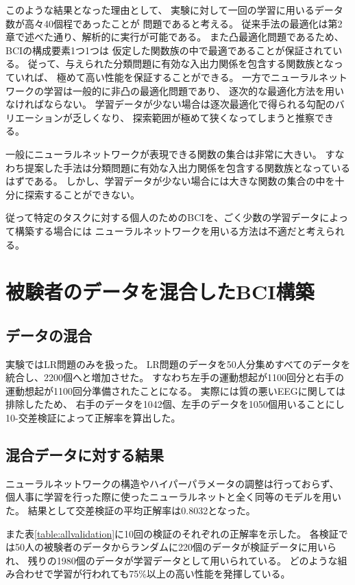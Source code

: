このような結果となった理由として、
実験に対して一回の学習に用いるデータ数が高々40個程であったことが
問題であると考える。
従来手法の最適化は第2章で述べた通り、解析的に実行が可能である。
また凸最適化問題であるため、BCIの構成要素1つ1つは
仮定した関数族の中で最適であることが保証されている。
従って、与えられた分類問題に有効な入出力関係を包含する関数族となっていれば、
極めて高い性能を保証することができる。
一方でニューラルネットワークの学習は一般的に非凸の最適化問題であり、
逐次的な最適化方法を用いなければならない。
学習データが少ない場合は逐次最適化で得られる勾配のバリエーションが乏しくなり、
探索範囲が極めて狭くなってしまうと推察できる。

一般にニューラルネットワークが表現できる関数の集合は非常に大きい。
すなわち提案した手法は分類問題に有効な入出力関係を包含する関数族となっているはずである。
しかし、学習データが少ない場合には大きな関数の集合の中を十分に探索することができない。

従って特定のタスクに対する個人のためのBCIを、ごく少数の学習データによって構築する場合には
ニューラルネットワークを用いる方法は不適だと考えられる。

\section{\mc 被験者のデータを混合したBCI構築}
\subsection{\mc データの混合}
実験ではLR問題のみを扱った。
LR問題のデータを50人分集めすべてのデータを統合し、2200個へと増加させた。
すなわち左手の運動想起が1100回分と右手の運動想起が1100回分準備されたことになる。
実際には質の悪いEEGに関しては排除したため、
右手のデータを1042個、左手のデータを1050個用いることにし10-交差検証によって正解率を算出した。

\subsection{\mc 混合データに対する結果}
ニューラルネットワークの構造やハイパーパラメータの調整は行っておらず、
個人事に学習を行った際に使ったニューラルネットと全く同等のモデルを用いた。
結果として交差検証の平均正解率は0.8032となった。

また表\ref{table:allvalidation}に10回の検証のそれぞれの正解率を示した。
各検証では50人の被験者のデータからランダムに220個のデータが検証データに用いられ、
残りの1980個のデータが学習データとして用いられている。
どのような組み合わせで学習が行われても75\%以上の高い性能を発揮している。
\begin{table}[t]
    \centering
    \caption{10交差検証の内訳}
    \label{table:allvalidation}
\end{table}

